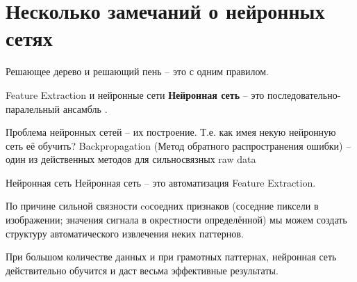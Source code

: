 \section{Несколько замечаний о нейронных сетях}\label{section:neneural_network}


\begin{frame}{Решающее дерево и решающий пень}
	 -- это 
	 с одним правилом.
	
	
	
\end{frame}

\begin{frame}{Feature Extraction и нейронные сети}
	\textbf{Нейронная сеть} --
	это последовательно-паралельный ансамбль 
	.
	
	
	Проблема нейронных сетей -- их построение. Т.е.
	как имея некую нейронную сеть её обучить?
	Backpropagation (Метод обратного распространения ошибки) 
	-- один из действенных методов для сильносвязных raw data
\end{frame}

\begin{frame}{Нейронная сеть}
	Нейронная сеть -- это автоматизация Feature Extraction.
	
	По причине сильной связности coсоедних признаков
	(соседние пиксели в изображении; значения сигнала в окрестности определённой)
	мы можем создать структуру автоматического извлечения неких паттернов.
	
	При большом количестве данных и при грамотных паттернах, нейронная сеть
	действительно обучится и даст весьма эффективные результаты.
	
\end{frame}

